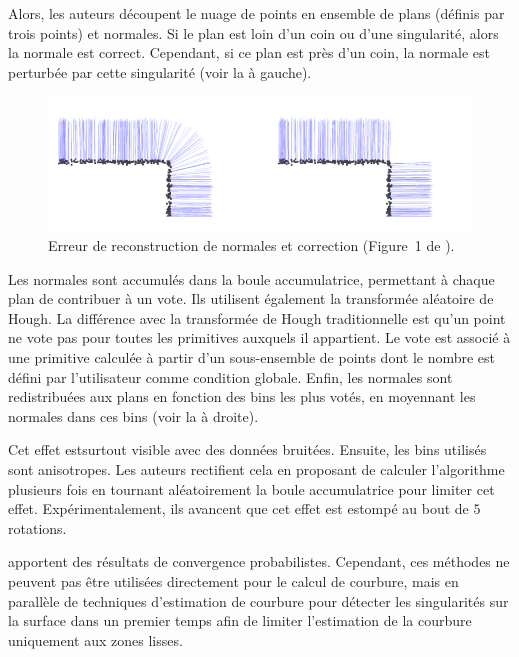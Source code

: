 Alors, les auteurs découpent le nuage de points en ensemble de plans (définis
par trois points) et normales. Si le plan est loin d'un coin ou d'une
singularité, alors la normale est correct. Cependant, si ce plan est près d'un
coin, la normale est perturbée par cette singularité (voir la
 à gauche).

\begin{figure}[ht]{
    \begin{center}
    \includegraphics[width=15cm]{images/Curvature/Hough_bad}
    \end{center}}
    \caption[Erreur de reconstruction de normales et correction.]{Erreur de reconstruction de normales et correction (Figure~1 de \cite{Boulch2012}). \label{fig:Hough-bad}}
\end{figure}

Les normales sont accumulés dans la boule accumulatrice, permettant à chaque
plan de contribuer à un vote. Ils utilisent également la transformée aléatoire
de Hough. La différence avec la transformée de Hough traditionnelle est qu'un
point ne vote pas pour toutes les primitives auxquels il appartient. Le vote est
associé à une primitive calculée à partir d'un sous-ensemble de points
\cite{Xu1990, Xu1993} dont le nombre est défini par l'utilisateur comme
condition globale. Enfin, les normales sont redistribuées aux plans en fonction
des bins les plus votés, en moyennant les normales dans ces bins (voir la
 à droite).


 Cet
effet estsurtout visible avec des données bruitées. Ensuite, les bins utilisés
sont anisotropes. Les auteurs rectifient cela en proposant de calculer
l’algorithme plusieurs fois en tournant aléatoirement la boule accumulatrice
pour limiter cet effet. Expérimentalement, ils avancent que cet effet est
estompé au bout de $5$ rotations.


 apportent des résultats de convergence probabilistes.
Cependant, ces méthodes ne peuvent pas être utilisées directement pour le calcul
de courbure, mais en parallèle de techniques d'estimation de courbure pour
détecter les singularités sur la surface dans un premier temps afin de limiter
l'estimation de la courbure uniquement aux zones lisses.
%
